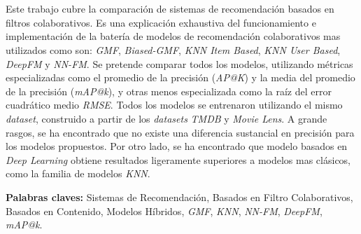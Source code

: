 \chapter*{\runtitulo}

\noindent Este trabajo cubre la comparación de sistemas de recomendación basados
en filtros colaborativos. Es una explicación exhaustiva del funcionamiento e
implementación de la batería de modelos de recomendación colaborativos mas utilizados
como son: \textit{GMF}, \textit{Biased-GMF}, \textit{KNN Item Based},
\textit{KNN User Based}, \textit{DeepFM} y \textit{NN-FM}. Se pretende comparar
todos los modelos, utilizando métricas especializadas como el promedio
de la precisión (\textit{AP@K}) y la media del promedio de la
precisión (\textit{mAP@k}), y otras menos especializada como la raíz
del error cuadrático medio \textit{RMSE}. Todos los modelos se entrenaron
utilizando el mismo \textit{dataset}, construido a partir de los
\textit{datasets} \textit{TMDB} y \textit{Movie Lens}. A grande rasgos,
se ha encontrado que no existe una diferencia sustancial en precisión
para los modelos propuestos. Por otro lado, se ha encontrado que modelo
basados en \textit{Deep Learning} obtiene resultados ligeramente superiores
a modelos mas clásicos, como la familia de modelos \textit{KNN}.

\bigskip

\noindent\textbf{Palabras claves:} Sistemas de Recomendación,
Basados en Filtro Colaborativos, Basados en Contenido,
Modelos Híbridos, \textit{GMF}, \textit{KNN}, \textit{NN-FM},
\textit{DeepFM}, \textit{mAP@k}.